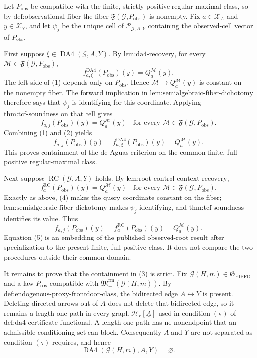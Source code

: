 Let \(P_{\mathrm{obs}}\) be compatible with the finite, strictly positive regular-maximal class, so by \(\text{def:observational-fiber}\) the fiber \(\mathfrak F(\mathcal G,P_{\mathrm{obs}})\) is nonempty. Fix \(a\in\mathcal X_A\) and \(y\in\mathcal X_Y\), and let \(\psi_j\) be the unique cell of \(\mathscr P_{\mathcal G,A,Y}\) containing the observed-cell vector of \(P_{\mathrm{obs}}\).

First suppose \(\xi\in\operatorname{DA4}(\mathcal G,A,Y)\). By \(\text{lem:da4-recovery}\), for every \(\mathcal M\in\mathfrak F(\mathcal G,P_{\mathrm{obs}})\),
\[
f^{\mathrm{DA4}}_{a,\xi}(P_{\mathrm{obs}})(y)=Q_a^{\mathcal M}(y).
\tag{1}
\]
The left side of (1) depends only on \(P_{\mathrm{obs}}\). Hence \(\mathcal M\mapsto Q_a^{\mathcal M}(y)\) is constant on the nonempty fiber. The forward implication in \(\text{lem:semialgebraic-fiber-dichotomy}\) therefore says that \(\psi_j\) is identifying for this coordinate. Applying \(\text{thm:tcf-soundness}\) on that cell gives
\[
f_{a,j}(P_{\mathrm{obs}})(y)=Q_a^{\mathcal M}(y)
\quad
\text{for every }\mathcal M\in\mathfrak F(\mathcal G,P_{\mathrm{obs}}).
\tag{2}
\]
Combining (1) and (2) yields
\[
f_{a,j}(P_{\mathrm{obs}})(y)
=f^{\mathrm{DA4}}_{a,\xi}(P_{\mathrm{obs}})(y)
=Q_a^{\mathcal M}(y).
\tag{3}
\]
This proves containment of the de Aguas criterion on the common finite, full-positive regular-maximal class.

Next suppose \(\operatorname{RC}(\mathcal G,A,Y)\) holds. By \(\text{lem:root-control-context-recovery}\),
\[
f_a^{\mathrm{RC}}(P_{\mathrm{obs}})(y)=Q_a^{\mathcal M}(y)
\quad
\text{for every }\mathcal M\in\mathfrak F(\mathcal G,P_{\mathrm{obs}}).
\tag{4}
\]
Exactly as above, (4) makes the query coordinate constant on the fiber; \(\text{lem:semialgebraic-fiber-dichotomy}\) makes \(\psi_j\) identifying, and \(\text{thm:tcf-soundness}\) identifies its value. Thus
\[
f_{a,j}(P_{\mathrm{obs}})(y)
=f_a^{\mathrm{RC}}(P_{\mathrm{obs}})(y)
=Q_a^{\mathcal M}(y).
\tag{5}
\]
Equation (5) is an embedding of the published observed-root result after specialization to the present finite, full-positive class. It does not compare the two procedures outside their common domain.

It remains to prove that the containment in (3) is strict. Fix \(\mathcal G(H,m)\in\mathfrak G_{\mathrm{EIPFD}}\) and a law \(P_{\mathrm{obs}}\) compatible with \(\mathfrak M_{+}^{\mathrm{rm}}(\mathcal G(H,m))\). By \(\text{def:endogenous-proxy-frontdoor-class}\), the bidirected edge \(A\leftrightarrow Y\) is present. Deleting directed arrows out of \(A\) does not delete that bidirected edge, so it remains a length-one path in every graph \(\mathcal H_r[\underline A]\) used in condition \(\mathrm{(v)}\) of \(\text{def:da4-certificate-functional}\). A length-one path has no nonendpoint that an admissible conditioning set can block. Consequently \(A\) and \(Y\) are not separated as condition \(\mathrm{(v)}\) requires, and hence
\[
\operatorname{DA4}(\mathcal G(H,m),A,Y)=\varnothing.
\tag{6}
\]

